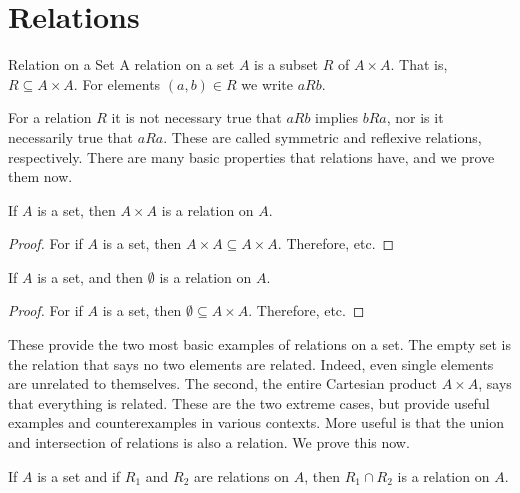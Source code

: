 \documentclass[crop=false,class=book,oneside]{standalone}
\begin{document}
    \section{Relations}
        \begin{ldefinition}{Relation on a Set}
            A relation on a set $A$ is a subset $R$ of $A\times{A}$.
            That is, $R\subseteq{A}\times{A}$. For elements $(a,b)\in{R}$
            we write $aRb$.
        \end{ldefinition}
        For a relation $R$ it is not necessary true that $aRb$ implies
        $bRa$, nor is it necessarily true that $aRa$. These are called
        symmetric and reflexive relations, respectively. There are many
        basic properties that relations have, and we prove them now.
        \begin{theorem}
            \label{thm:Set_Theory_Entire_Cartesian_Product_Is_Relation}
            If $A$ is a set, then $A\times{A}$ is a relation on $A$.
        \end{theorem}
        \begin{proof}
            For if $A$ is a set, then $A\times{A}\subseteq{A}\times{A}$.
            Therefore, etc.
        \end{proof}
        \begin{theorem}
            \label{thm:Set_Theory_Empty_Set_Is_Relation}
            If $A$ is a set, and then $\emptyset$ is a relation on $A$.
        \end{theorem}
        \begin{proof}
            For if $A$ is a set, then $\emptyset\subseteq{A}\times{A}$.
            Therefore, etc.
        \end{proof}
        These provide the two most basic examples of relations on a set.
        The empty set is the relation that says no two elements are
        related. Indeed, even single elements are unrelated to themselves.
        The second, the entire Cartesian product $A\times{A}$, says
        that everything is related. These are the two extreme cases, but
        provide useful examples and counterexamples in various contexts.
        More useful is that the union and intersection of relations is
        also a relation. We prove this now.
        \begin{theorem}
            \label{thm:Set_Theory_Intersection_of_Relations_Is_Relation}
            If $A$ is a set and if $R_{1}$ and $R_{2}$ are relations
            on $A$, then $R_{1}\cap{R}_{2}$ is a relation on $A$.
        \end{theorem}
\end{document}

